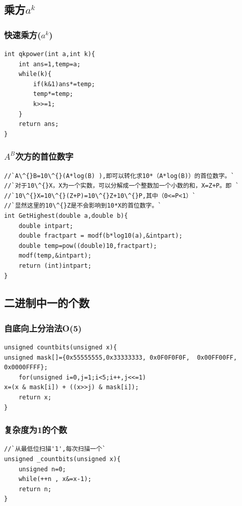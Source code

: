 \documentclass[a4paper]{article}
\begin{document}
\begin{CJK*}{UTF8}{gbsn}
\begin{multicols}{3}
\begin{flushleft}
\subsection{乘方$a^k$}

\subsubsection{快速乘方($a^k$)}
\begin{lstlisting}
int qkpower(int a,int k){
	int ans=1,temp=a;
	while(k){
		if(k&1)ans*=temp;
		temp*=temp;
		k>>=1; 
	} 
	return ans; 
} 
\end{lstlisting}


\subsubsection{$A^B$次方的首位数字}
\begin{lstlisting}
//`A\^{}B=10\^{}(A*log(B) ),即可以转化求10*（A*log(B)）的首位数字。`
//`对于10\^{}X，X为一个实数，可以分解成一个整数加一个小数的和，X=Z+P。即 `
//`10\^{}X=10\^{}(Z+P)=10\^{}Z+10\^{}P,其中（0<=P<1）`
//`显然这里的10\^{}Z是不会影响到10*X的首位数字。`
int GetHighest(double a,double b){
    double intpart;
    double fractpart = modf(b*log10(a),&intpart);
    double temp=pow((double)10,fractpart);
    modf(temp,&intpart);
    return (int)intpart;  
}
\end{lstlisting}



\subsection{二进制中一的个数}

\subsubsection{自底向上分治法O(5)}
\begin{lstlisting}
unsigned countbits(unsigned x){
unsigned mask[]={0x55555555,0x33333333, 0x0F0F0F0F,  0x00FF00FF, 0x0000FFFF};
	for(unsigned i=0,j=1;i<5;i++,j<<=1)
x=(x & mask[i]) + ((x>>j) & mask[i]);
	return x;
} 
\end{lstlisting}


\subsubsection{复杂度为1的个数}
\begin{lstlisting}
//`从最低位扫描'1',每次扫描一个`
unsigned _countbits(unsigned x){
	unsigned n=0;
	while(++n , x&=x-1);
	return n;
} 
\end{lstlisting}



\end{flushleft}
\end{multicols}
\end{CJK*}
\end{document}
